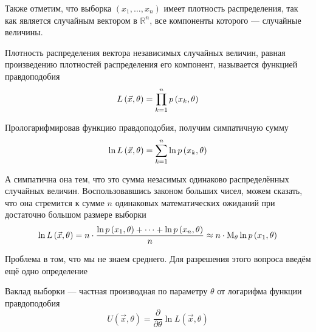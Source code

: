 Также отметим, что выборка $\left( x_1, \dots, x_n \right)$
имеет плотность распределения,
так как является случайным вектором в $\mathbb{R}^n$,
все компоненты которого --- случайные величины.

\begin{definition}
    \label{def:likehoodFunction}
    Плотность распределения вектора независимых случайных величин,
    равная произведению плотностей распределения его компонент,
    называется функцией правдоподобия
    $$L\left( \vec{x},\theta \right)=\prod_{k=1}^np\left(x_k,\theta\right)$$
\end{definition}

Прологарифмировав функцию правдоподобия, получим симпатичную сумму
$$\ln{L\left( \vec{x},\theta \right)}=\sum_{k=1}^n\ln{p\left(x_k,\theta\right)}$$

А симпатична она тем,
что это сумма незасимых одинаково распределённых случайных величин.
Воспользовавшись законом больших чисел, можем сказать,
что она стремится к сумме $n$ одинаковых математических ожиданий
при достаточно большом размере выборки
$$\ln{L\left( \vec{x},\theta \right)}
    = n\cdot\frac{\ln{p\left(x_1,\theta\right)}+\dots+\ln{p\left(x_n,\theta\right)}}{n}
    \approx n\cdot\operatorname{M}_{\theta} \ln{p\left(x_1,\theta\right)}$$

Проблема в том, что мы не знаем среднего.
Для разрешения этого вопроса введём ещё одно определение

\begin{definition}\label{def:defU}
    Ваклад выборки --- частная производная по параметру $\theta$
    от логарифма функции правдоподобия
    $$U\left( \vec{x},\theta \right)
            =\frac{\partial}{\partial\theta}\ln{L\left(\vec{x},\theta\right)}$$
\end{definition}

